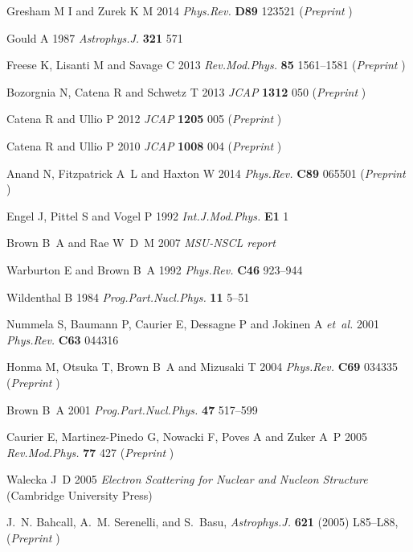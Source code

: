 \documentclass[11pt,a4paper]{article}
\begin{document}
\begin{thebibliography}{10}
Gresham M I and Zurek K M 2014 {\em Phys.Rev.\/} {\bf D89} 123521
(\textit{Preprint} )

Gould A 1987 {\em Astrophys.J.\/} {\bf 321} 571

Freese K, Lisanti M and Savage C 2013 {\em Rev.Mod.Phys.\/} {\bf 85} 1561--1581
  (\textit{Preprint} )

Bozorgnia N, Catena R and Schwetz T 2013 {\em JCAP\/} {\bf 1312} 050
  (\textit{Preprint} )

Catena R and Ullio P 2012 {\em JCAP\/} {\bf 1205} 005 (\textit{Preprint}
  )

Catena R and Ullio P 2010 {\em JCAP\/} {\bf 1008} 004 (\textit{Preprint}
  )

Anand N, Fitzpatrick A~L and Haxton W 2014 {\em Phys.Rev.\/} {\bf C89} 065501
  (\textit{Preprint} )
  
Engel J, Pittel S and Vogel P 1992 {\em Int.J.Mod.Phys.\/} {\bf E1} 1
  
Brown B~A and Rae W~D~M 2007 {\em MSU-NSCL report\/}

Warburton E and Brown B~A 1992 {\em Phys.Rev.\/} {\bf C46} 923--944

Wildenthal B 1984 {\em Prog.Part.Nucl.Phys.\/} {\bf 11} 5--51

Nummela S, Baumann P, Caurier E, Dessagne P and Jokinen A {\em et~al.\/} 2001 {\em
  Phys.Rev.\/} {\bf C63} 044316

Honma M, Otsuka T, Brown B~A and Mizusaki T 2004 {\em Phys.Rev.\/} {\bf C69}
  034335 (\textit{Preprint} )

Brown B~A 2001 {\em Prog.Part.Nucl.Phys.\/} {\bf 47} 517--599

Caurier E, Martinez-Pinedo G, Nowacki F, Poves A and Zuker A~P 2005
{\em Rev.Mod.Phys.\/} {\bf 77}  427 (\textit{Preprint} )

Walecka J~D 2005 {\em Electron Scattering for Nuclear and Nucleon Structure\/}
  (Cambridge University Press)
  
J.~N. Bahcall, A.~M. Serenelli, and S.~Basu, {\em Astrophys.J.} {\bf 621} (2005) L85--L88, (\textit{Preprint} )
  

\end{thebibliography}
\end{document}
